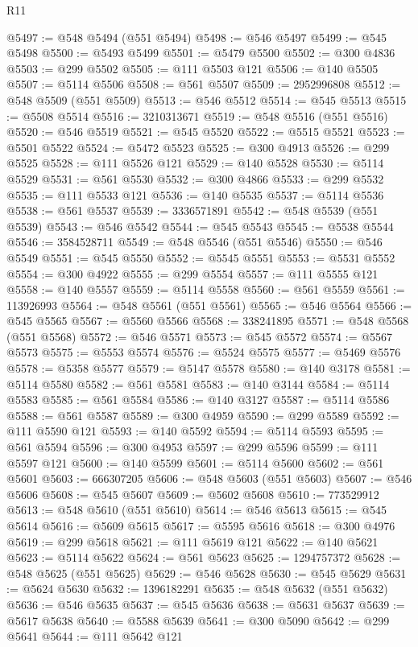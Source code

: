 \begin{lexlean}{R11}
\begin{coremodule}
{{{{{{{{{{{{{{{{{{{{{{{{{{{{{{{{{{{{{{{{{{{{{{{{{{{{{{{{{{{{{{{{{{{{{{{{{{{{{{{{{{@5497 := @548 @5494 (@551 @5494)
@5498 := @546 @5497
@5499 := @545 @5498
@5500 := @5493 @5499
@5501 := @5479 @5500
@5502 := @300 @4836
@5503 := @299 @5502
@5505 := @111 @5503 @121
@5506 := @140 @5505
@5507 := @5114 @5506
@5508 := @561 @5507
@5509 := 2952996808
@5512 := @548 @5509 (@551 @5509)
@5513 := @546 @5512
@5514 := @545 @5513
@5515 := @5508 @5514
@5516 := 3210313671
@5519 := @548 @5516 (@551 @5516)
@5520 := @546 @5519
@5521 := @545 @5520
@5522 := @5515 @5521
@5523 := @5501 @5522
@5524 := @5472 @5523
@5525 := @300 @4913
@5526 := @299 @5525
@5528 := @111 @5526 @121
@5529 := @140 @5528
@5530 := @5114 @5529
@5531 := @561 @5530
@5532 := @300 @4866
@5533 := @299 @5532
@5535 := @111 @5533 @121
@5536 := @140 @5535
@5537 := @5114 @5536
@5538 := @561 @5537
@5539 := 3336571891
@5542 := @548 @5539 (@551 @5539)
@5543 := @546 @5542
@5544 := @545 @5543
@5545 := @5538 @5544
@5546 := 3584528711
@5549 := @548 @5546 (@551 @5546)
@5550 := @546 @5549
@5551 := @545 @5550
@5552 := @5545 @5551
@5553 := @5531 @5552
@5554 := @300 @4922
@5555 := @299 @5554
@5557 := @111 @5555 @121
@5558 := @140 @5557
@5559 := @5114 @5558
@5560 := @561 @5559
@5561 := 113926993
@5564 := @548 @5561 (@551 @5561)
@5565 := @546 @5564
@5566 := @545 @5565
@5567 := @5560 @5566
@5568 := 338241895
@5571 := @548 @5568 (@551 @5568)
@5572 := @546 @5571
@5573 := @545 @5572
@5574 := @5567 @5573
@5575 := @5553 @5574
@5576 := @5524 @5575
@5577 := @5469 @5576
@5578 := @5358 @5577
@5579 := @5147 @5578
@5580 := @140 @3178
@5581 := @5114 @5580
@5582 := @561 @5581
@5583 := @140 @3144
@5584 := @5114 @5583
@5585 := @561 @5584
@5586 := @140 @3127
@5587 := @5114 @5586
@5588 := @561 @5587
@5589 := @300 @4959
@5590 := @299 @5589
@5592 := @111 @5590 @121
@5593 := @140 @5592
@5594 := @5114 @5593
@5595 := @561 @5594
@5596 := @300 @4953
@5597 := @299 @5596
@5599 := @111 @5597 @121
@5600 := @140 @5599
@5601 := @5114 @5600
@5602 := @561 @5601
@5603 := 666307205
@5606 := @548 @5603 (@551 @5603)
@5607 := @546 @5606
@5608 := @545 @5607
@5609 := @5602 @5608
@5610 := 773529912
@5613 := @548 @5610 (@551 @5610)
@5614 := @546 @5613
@5615 := @545 @5614
@5616 := @5609 @5615
@5617 := @5595 @5616
@5618 := @300 @4976
@5619 := @299 @5618
@5621 := @111 @5619 @121
@5622 := @140 @5621
@5623 := @5114 @5622
@5624 := @561 @5623
@5625 := 1294757372
@5628 := @548 @5625 (@551 @5625)
@5629 := @546 @5628
@5630 := @545 @5629
@5631 := @5624 @5630
@5632 := 1396182291
@5635 := @548 @5632 (@551 @5632)
@5636 := @546 @5635
@5637 := @545 @5636
@5638 := @5631 @5637
@5639 := @5617 @5638
@5640 := @5588 @5639
@5641 := @300 @5090
@5642 := @299 @5641
@5644 := @111 @5642 @121
}}}}}}}}}}}}}}}}}}}}}}}}}}}}}}}}}}}}}}}}}}}}}}}}}}}}}}}}}}}}}}}}}}}}}}}}}}}}}}}}}}
\end{coremodule}
\end{lexlean}
